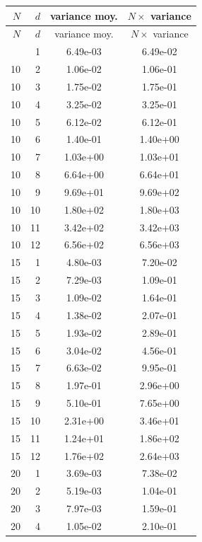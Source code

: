 \begin{longtable}{r r S[table-format=1.2e-2] S[table-format=1.2e-2]}
\toprule
{\(N\)} & {\(d\)} & {variance moy.} & {\(N \times\) variance} \\
\midrule
\endfirsthead
\toprule
{\(N\)} & {\(d\)} & {variance moy.} & {\(N \times\) variance} \\
\midrule
\endhead
\bottomrule
{} & 1 & 6.49e-03 & 6.49e-02 \\
10 & 2 & 1.06e-02 & 1.06e-01 \\
10 & 3 & 1.75e-02 & 1.75e-01 \\
10 & 4 & 3.25e-02 & 3.25e-01 \\
10 & 5 & 6.12e-02 & 6.12e-01 \\
10 & 6 & 1.40e-01 & 1.40e+00 \\
10 & 7 & 1.03e+00 & 1.03e+01 \\
10 & 8 & 6.64e+00 & 6.64e+01 \\
10 & 9 & 9.69e+01 & 9.69e+02 \\
10 & 10 & 1.80e+02 & 1.80e+03 \\
10 & 11 & 3.42e+02 & 3.42e+03 \\
10 & 12 & 6.56e+02 & 6.56e+03 \\
15 & 1 & 4.80e-03 & 7.20e-02 \\
15 & 2 & 7.29e-03 & 1.09e-01 \\
15 & 3 & 1.09e-02 & 1.64e-01 \\
15 & 4 & 1.38e-02 & 2.07e-01 \\
15 & 5 & 1.93e-02 & 2.89e-01 \\
15 & 6 & 3.04e-02 & 4.56e-01 \\
15 & 7 & 6.63e-02 & 9.95e-01 \\
15 & 8 & 1.97e-01 & 2.96e+00 \\
15 & 9 & 5.10e-01 & 7.65e+00 \\
15 & 10 & 2.31e+00 & 3.46e+01 \\
15 & 11 & 1.24e+01 & 1.86e+02 \\
15 & 12 & 1.76e+02 & 2.64e+03 \\
20 & 1 & 3.69e-03 & 7.38e-02 \\
20 & 2 & 5.19e-03 & 1.04e-01 \\
20 & 3 & 7.97e-03 & 1.59e-01 \\
20 & 4 & 1.05e-02 & 2.10e-01 \\

\end{longtable}

